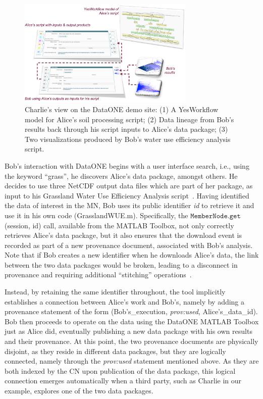 \documentclass[a4paper]{llncs}
\newcommand{\mytt}[1]{\ensuremath{\mathtt{#1}}}
\begin{document}
\begin{figure}[h]
\centering   
\includegraphics[width=0.75\textwidth]{figs/abc-crop}
\caption{Charlie's view on the DataONE demo site: (1) A YesWorkflow model for Alice's soil processing script; (2) Data lineage from Bob's results back through his script inputs to Alice's data package; (3) Two visualizations produced by Bob's water use efficiency analysis script.}
\label{fig2}
\end{figure}


Bob's interaction with DataONE begins with a user interface search, i.e., using the keyword ``grass'', he discovers Alice's data package, amongst others. 
He decides to use three NetCDF output data files which are part of her package, as input to his Grassland Water Use Efficiency Analysis script~\cite{MsTMIP-model-output-data-set}. 
Having identified the data of interest in the MN, Bob uses its public identifier \textit{id} to retrieve it and use it in his own code (GrasslandWUE.m).
Specifically, the \mytt{MemberNode.get}(session, id)  call, available from the MATLAB Toolbox, not only correctly retrieves Alice's data package, but it also ensures that the download event is recorded as part of a new provenance document, associated with Bob's analysis.
%
Note that if Bob creates a new identifier when he downloads Alice's data, the link between the two data packages would be broken, leading to a disconnect in provenance and requiring additional ``stitching'' operations~\cite{missing-link}.  

Instead, by retaining the same identifier throughout, the tool implicitly establishes a connection between Alice's work and Bob's, namely by adding a provenance statement of the form (Bob's\_execution, \emph{prov:used}, Alice's\_data\_id). Bob then proceeds to operate on the data using the DataONE MATLAB Toolbox just as Alice did, eventually publishing a new data package with his own results and their provenance.
At this point, the two provenance documents are physically disjoint, as they reside in different data packages, but they are logically connected, namely through the \emph{prov:used} statement mentioned above.
As they are both indexed by the CN upon publication of the data package, this logical connection emerges automatically when a third party, such as Charlie in our example, explores one of the two data packages.
\end{document}
